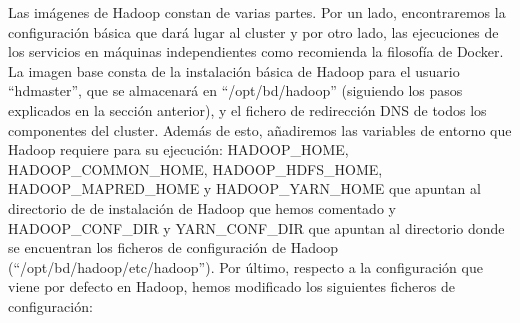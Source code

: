 Las imágenes de Hadoop constan de varias partes. Por un lado, encontraremos la configuración básica que dará lugar al cluster y por otro lado, las ejecuciones de los servicios en máquinas independientes como recomienda la filosofía de Docker. La imagen base consta de la instalación básica de Hadoop para el usuario “hdmaster”, que se almacenará en “/opt/bd/hadoop” (siguiendo los pasos explicados en la sección anterior), y el fichero de redirección DNS de todos los componentes del cluster. Además de esto, añadiremos las variables de entorno que Hadoop requiere para su ejecución: HADOOP\_HOME, HADOOP\_COMMON\_HOME, HADOOP\_HDFS\_HOME, HADOOP\_MAPRED\_HOME y HADOOP\_YARN\_HOME que apuntan al directorio de de instalación de Hadoop que hemos comentado y HADOOP\_CONF\_DIR y YARN\_CONF\_DIR que apuntan al directorio donde se encuentran los ficheros de configuración de Hadoop (“/opt/bd/hadoop/etc/hadoop”). Por último, respecto a la configuración que viene por defecto en Hadoop, hemos modificado los siguientes ficheros de configuración:

